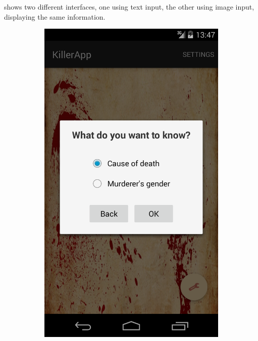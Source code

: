 \documentclass{mproj}
\begin{document}
 shows two different interfaces, one using text input, the other using image input,  displaying the same information.

\begin{figure}[h]
	\centering
	\begin{subfigure}{0.25\textwidth}
		\includegraphics[width=\textwidth]{images/class_dialog}		
	\end{subfigure}		
	\quad
	\begin{subfigure}{0.25\textwidth}

\end{subfigure}
\end{figure}
\end{document}
